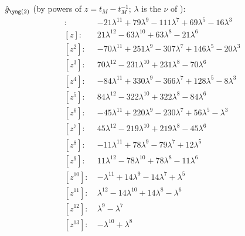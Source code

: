 $\hat g_{\ytwo}$ (by powers of $z = t_M - t_M^{-1}$; $\lambda$ is the $\nu$ of \cite{Marino09}):
\begin{align*}
[z^{0}]\colon\ & -21 \lambda^{11} +79 \lambda^{9} -111 \lambda^{7} +69 \lambda^{5} -16 \lambda^{3} \\
[z]\colon\ & 21 \lambda^{12} -63 \lambda^{10} +63 \lambda^{8} -21 \lambda^{6} \\
[z^{2}]\colon\ & -70 \lambda^{11} +251 \lambda^{9} -307 \lambda^{7} +146 \lambda^{5} -20 \lambda^{3} \\
[z^{3}]\colon\ & 70 \lambda^{12} -231 \lambda^{10} +231 \lambda^{8} -70 \lambda^{6} \\
[z^{4}]\colon\ & -84 \lambda^{11} +330 \lambda^{9} -366 \lambda^{7} +128 \lambda^{5} -8 \lambda^{3} \\
[z^{5}]\colon\ & 84 \lambda^{12} -322 \lambda^{10} +322 \lambda^{8} -84 \lambda^{6} \\
[z^{6}]\colon\ & -45 \lambda^{11} +220 \lambda^{9} -230 \lambda^{7} +56 \lambda^{5} -\lambda^{3} \\
[z^{7}]\colon\ & 45 \lambda^{12} -219 \lambda^{10} +219 \lambda^{8} -45 \lambda^{6} \\
[z^{8}]\colon\ & -11 \lambda^{11} +78 \lambda^{9} -79 \lambda^{7} +12 \lambda^{5} \\
[z^{9}]\colon\ & 11 \lambda^{12} -78 \lambda^{10} +78 \lambda^{8} -11 \lambda^{6} \\
[z^{10}]\colon\ & -\lambda^{11} +14 \lambda^{9} -14 \lambda^{7} +\lambda^{5} \\
[z^{11}]\colon\ & \lambda^{12} -14 \lambda^{10} +14 \lambda^{8} -\lambda^{6} \\
[z^{12}]\colon\ & \lambda^{9} -\lambda^{7} \\
[z^{13}]\colon\ & -\lambda^{10} +\lambda^{8}
\end{align*}

